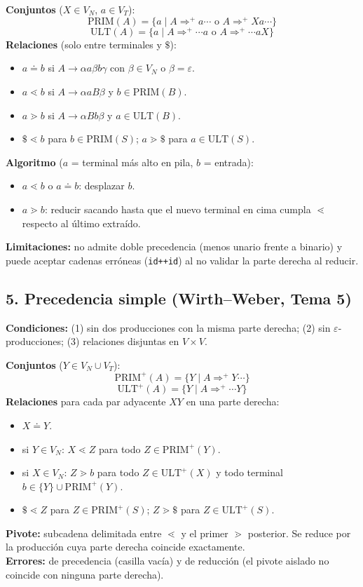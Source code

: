 \begin{landscape}
\begin{multicols*}{3}
\textbf{Conjuntos} ($X\in V_N$, $a\in V_T$):
\[
\mathrm{PRIM}(A)=\{a\mid A\Rightarrow^+a\cdots\text{ o }A\Rightarrow^+Xa\cdots\}
\]
\[
\mathrm{ULT}(A)=\{a\mid A\Rightarrow^+\cdots a\text{ o }A\Rightarrow^+\cdots aX\}
\]
\textbf{Relaciones} (solo entre terminales y $\$$):
\begin{itemize}
\item $a\doteq b$ si $A\to\alpha a\beta b\gamma$ con $\beta\in V_N$ o $\beta=\varepsilon$.
\item $a\lessdot b$ si $A\to\alpha aB\beta$ y $b\in\mathrm{PRIM}(B)$.
\item $a\gtrdot b$ si $A\to\alpha Bb\beta$ y $a\in\mathrm{ULT}(B)$.
\item $\$\lessdot b$ para $b\in\mathrm{PRIM}(S)$; $a\gtrdot\$$ para $a\in\mathrm{ULT}(S)$.
\end{itemize}
\textbf{Algoritmo} ($a$ = terminal más alto en pila, $b$ = entrada):
\begin{itemize}
\item $a\lessdot b$ o $a\doteq b$: desplazar $b$.
\item $a\gtrdot b$: reducir sacando hasta que el nuevo terminal en cima cumpla $\lessdot$ respecto al último extraído.
\end{itemize}
\textbf{Limitaciones:} no admite doble precedencia (menos unario frente a binario) y puede aceptar cadenas erróneas (\texttt{id++id}) al no validar la parte derecha al reducir.

\columnbreak

\subsection*{5. Precedencia simple (Wirth--Weber, Tema 5)}
\textbf{Condiciones:} (1) sin dos producciones con la misma parte derecha; (2) sin $\varepsilon$-producciones; (3) relaciones disjuntas en $V\times V$.

\textbf{Conjuntos} ($Y\in V_N\cup V_T$):
\[
\mathrm{PRIM}^+(A)=\{Y\mid A\Rightarrow^+Y\cdots\}
\]
\[
\mathrm{ULT}^+(A)=\{Y\mid A\Rightarrow^+\cdots Y\}
\]
\textbf{Relaciones} para cada par adyacente $XY$ en una parte derecha:
\begin{itemize}
\item $X\doteq Y$.
\item si $Y\in V_N$: $X\lessdot Z$ para todo $Z\in\mathrm{PRIM}^+(Y)$.
\item si $X\in V_N$: $Z\gtrdot b$ para todo $Z\in\mathrm{ULT}^+(X)$ y todo terminal $b\in\{Y\}\cup\mathrm{PRIM}^+(Y)$.
\item $\$\lessdot Z$ para $Z\in\mathrm{PRIM}^+(S)$; $Z\gtrdot\$$ para $Z\in\mathrm{ULT}^+(S)$.
\end{itemize}
\textbf{Pivote:} subcadena delimitada entre $\lessdot$ y el primer $\gtrdot$ posterior. Se reduce por la producción cuya parte derecha coincide exactamente.\\
\textbf{Errores:} de precedencia (casilla vacía) y de reducción (el pivote aislado no coincide con ninguna parte derecha).


\end{multicols*}
\end{landscape}
